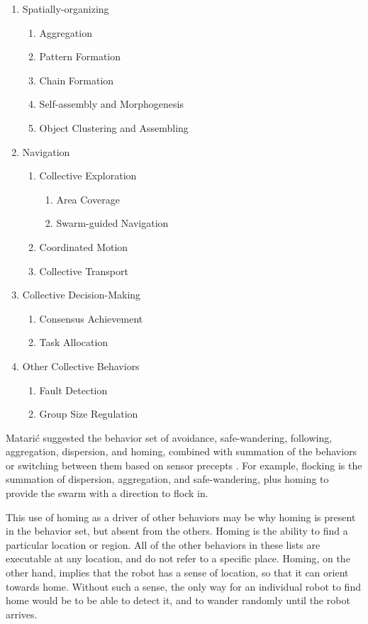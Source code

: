\documentclass[]{article}
\begin{document}
\begin{enumerate}[noitemsep]
\item Spatially-organizing
	\begin{enumerate}[noitemsep]
	\item Aggregation
	\item Pattern Formation
	\item Chain Formation
	\item Self-assembly and Morphogenesis
	\item Object Clustering and Assembling
	\end{enumerate}
\item Navigation
	\begin{enumerate}[noitemsep]
	\item Collective Exploration
		\begin{enumerate}[noitemsep]
		\item Area Coverage
		\item Swarm-guided Navigation
		\end{enumerate}
	\item Coordinated Motion
	\item Collective Transport
	\end{enumerate}
\item Collective Decision-Making
	\begin{enumerate}[noitemsep]
	\item Consensus Achievement
	\item Task Allocation
	\end{enumerate}
\item Other Collective Behaviors
	\begin{enumerate}[noitemsep]
	\item Fault Detection
	\item Group Size Regulation
	\end{enumerate}
\end{enumerate}


Matari\'c suggested the behavior set of avoidance, safe-wandering, following, aggregation, dispersion, and homing, combined with summation of the behaviors or switching between them based on sensor precepts \cite{mataric1995designing}. For example, flocking is the summation of dispersion, aggregation, and safe-wandering, plus homing to provide the swarm with a direction to flock in. 

This use of homing as a driver of other behaviors may be why homing is present in the behavior set, but absent from the others. 
Homing is the ability to find a particular location or region. 
All of the other behaviors in these lists are executable at any location, and do not refer to a specific place. 
Homing, on the other hand, implies that the robot has a sense of location, so that it can orient towards home. 
Without such a sense, the only way for an individual robot to find home would be to be able to detect it, and to wander randomly until the robot arrives. 
\end{document}
